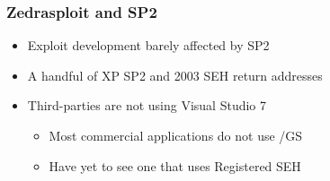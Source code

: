 \documentclass{beamer}
\newenvironment{sitemize}{\vspace{1mm}\begin{itemize}\itemsep 4pt\small}{\end{itemize}}
\begin{document}
\begin{frame}[t]
  \frametitle{Zedrasploit and SP2}
	\begin{sitemize}
		\item Exploit development barely affected by SP2
		\item A handful of XP SP2 and 2003 SEH return addresses
		\item Third-parties are not using Visual Studio 7
		\begin{sitemize}
			\item Most commercial applications do not use /GS
			\item Have yet to see one that uses Registered SEH
		\end{sitemize}
	\end{sitemize}
\end{frame}
\end{document}
